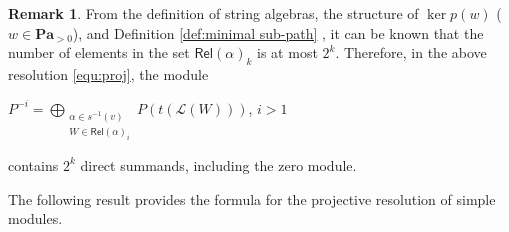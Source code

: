 \documentclass[11pt]{amsart}
\numberwithin{equation}{section}
\theoremstyle{definition}
\newtheorem{remark}[theorem]{Remark}
\begin{document}
\begin{remark}
	From the definition of string algebras, the structure of \( \ker p(w) \) (\( w \in \mathbf{Pa}_{>0} \)), and Definition \ref{def:minimal sub-path} , it can be known that the number of elements in the set \( \mathsf{Rel}(\alpha)_k \) is at most \( 2^k \). Therefore, in the above resolution \ref{equ:proj}, the module 
\begin{center}
		\( P^{-i} = \bigoplus\limits_{\substack{\alpha \in s^{-1}(v) \\ W \in \mathsf{Rel}(\alpha)_i}} P(t(\mathscr{L}(W))) \),  $i > 1 $
\end{center} 
	contains \( 2^k \) direct summands, including the zero module.
\end{remark}

The following result provides the formula for the projective resolution of simple modules.
\end{document}
